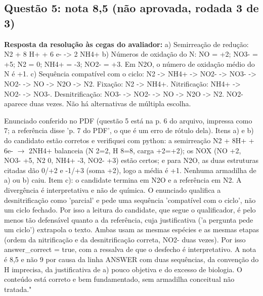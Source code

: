 \documentclass{article}%
\begin{document}
\subsection*{Questão 5: nota 8,5 (não aprovada, rodada 3 de 3)}%
\textbf{Resposta da resolução às cegas do avaliador:} a) Semirreação de redução: N2 + 8 H+ + 6 e{-} {-}> 2 NH4+\newline%
\newline%
b) Números de oxidação do N: NO = +2; NO3{-} = +5; N2 = 0; NH4+ = {-}3; NO2{-} = +3. Em N2O, o número de oxidação médio do N é +1.\newline%
\newline%
c) Sequência compatível com o ciclo: N2 {-}> NH4+ {-}> NO2{-} {-}> NO3{-} {-}> NO2{-} {-}> NO {-}> N2O {-}> N2. Fixação: N2 {-}> NH4+. Nitrificação: NH4+ {-}> NO2{-} {-}> NO3{-}. Desnitrificação: NO3{-} {-}> NO2{-} {-}> NO {-}> N2O {-}> N2. NO2{-} aparece duas vezes.\newline%
\newline%
Não há alternativas de múltipla escolha.\par %
Enunciado conferido no PDF (questão 5 está na p. 6 do arquivo, impressa como 7; a referência disse 'p. 7 do PDF', o que é um erro de rótulo dela). Itens a) e b) do candidato estão corretos e verifiquei com python: a semirreação N2 + 8H+ + 6e- $\to$ 2NH4+ balanceia (N 2=2, H 8=8, carga +2=+2); os NOX (NO +2, NO3- +5, N2 0, NH4+ -3, NO2- +3) estão certos; e para N2O, as duas estruturas citadas dão 0/+2 e -1/+3 (soma +2), logo a média é +1. Nenhuma armadilha de a) ou b) caiu. Item c): o candidate termina em N2O e a referência em N2. A divergência é interpretativa e não de química. O enunciado qualifica a desnitrificação como 'parcial' e pede uma sequência 'compatível com o ciclo', não um ciclo fechado. Por isso a leitura do candidate, que segue o qualificador, é pelo menos tão defensável quanto a da referência, cuja justificativa ('a pergunta pede um ciclo') extrapola o texto. Ambas usam as mesmas espécies e as mesmas etapas (ordem da nitrificação e da desnitrificação correta, NO2- duas vezes). Por isso answer\_correct = true, com a ressalva de que o desfecho é interpretativo. A nota é 8,5 e não 9 por causa da linha ANSWER com duas sequências, da convenção do H imprecisa, da justificativa de a) pouco objetiva e do excesso de biologia. O conteúdo está correto e bem fundamentado, sem armadilha conceitual não tratada."%
\end{document}
